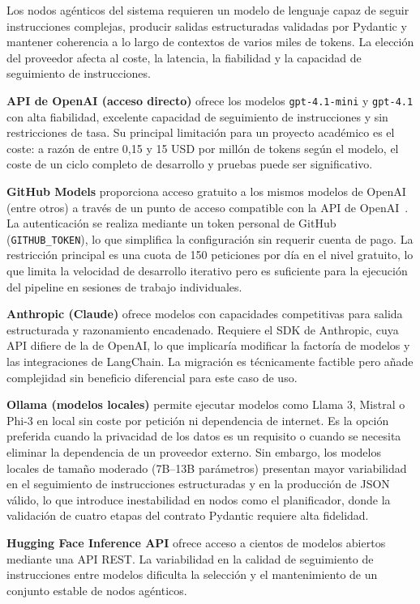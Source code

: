 Los nodos agénticos del sistema requieren un modelo de lenguaje capaz de seguir instrucciones complejas, producir salidas estructuradas validadas por Pydantic y mantener coherencia a lo largo de contextos de varios miles de tokens. La elección del proveedor afecta al coste, la latencia, la fiabilidad y la capacidad de seguimiento de instrucciones.

\textbf{API de OpenAI (acceso directo)} ofrece los modelos \texttt{gpt-4.1-mini} y \texttt{gpt-4.1} con alta fiabilidad, excelente capacidad de seguimiento de instrucciones y sin restricciones de tasa. Su principal limitación para un proyecto académico es el coste: a razón de entre 0,15 y 15 USD por millón de tokens según el modelo, el coste de un ciclo completo de desarrollo y pruebas puede ser significativo.

\textbf{GitHub Models} proporciona acceso gratuito a los mismos modelos de OpenAI (entre otros) a través de un punto de acceso compatible con la API de OpenAI~\cite{github_models}. La autenticación se realiza mediante un token personal de GitHub (\texttt{GITHUB\_TOKEN}), lo que simplifica la configuración sin requerir cuenta de pago. La restricción principal es una cuota de 150 peticiones por día en el nivel gratuito, lo que limita la velocidad de desarrollo iterativo pero es suficiente para la ejecución del pipeline en sesiones de trabajo individuales.

\textbf{Anthropic (Claude)} ofrece modelos con capacidades competitivas para salida estructurada y razonamiento encadenado. Requiere el SDK de Anthropic, cuya API difiere de la de OpenAI, lo que implicaría modificar la factoría de modelos y las integraciones de LangChain. La migración es técnicamente factible pero añade complejidad sin beneficio diferencial para este caso de uso.

\textbf{Ollama (modelos locales)} permite ejecutar modelos como Llama 3, Mistral o Phi-3 en local sin coste por petición ni dependencia de internet. Es la opción preferida cuando la privacidad de los datos es un requisito o cuando se necesita eliminar la dependencia de un proveedor externo. Sin embargo, los modelos locales de tamaño moderado (7B--13B parámetros) presentan mayor variabilidad en el seguimiento de instrucciones estructuradas y en la producción de JSON válido, lo que introduce inestabilidad en nodos como el planificador, donde la validación de cuatro etapas del contrato Pydantic requiere alta fidelidad.

\textbf{Hugging Face Inference API} ofrece acceso a cientos de modelos abiertos mediante una API REST. La variabilidad en la calidad de seguimiento de instrucciones entre modelos dificulta la selección y el mantenimiento de un conjunto estable de nodos agénticos.

